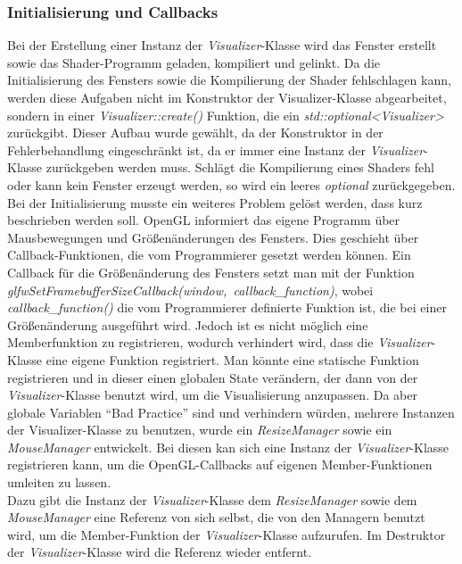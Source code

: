 \documentclass[11pt,a4paper]{article}
\begin{document}
\subsubsection{Initialisierung und Callbacks}
Bei der Erstellung einer Instanz der \mbox{\textit{Visualizer}}-Klasse wird das Fenster erstellt sowie das Shader-Programm geladen, kompiliert und gelinkt. Da die Initialisierung des Fensters sowie die Kompilierung der Shader fehlschlagen kann, werden diese Aufgaben nicht im Konstruktor der Visualizer-Klasse abgearbeitet, sondern in einer \mbox{\textit{Visualizer::create()}} Funktion, die ein \mbox{\textit{std::optional<Visualizer>}} zurückgibt. Dieser Aufbau wurde gewählt, da der Konstruktor in der Fehlerbehandlung eingeschränkt ist, da er immer eine Instanz der \mbox{\textit{Visualizer}}-Klasse zurückgeben werden muss. Schlägt die Kompilierung eines Shaders fehl oder kann kein Fenster erzeugt werden, so wird ein leeres \mbox{\textit{optional}} zurückgegeben.\\
Bei der Initialisierung musste ein weiteres Problem gelöst werden, dass kurz beschrieben werden soll. OpenGL informiert das eigene Programm über Mausbewegungen und Größenänderungen des Fensters. Dies geschieht über Callback-Funktionen, die vom Programmierer gesetzt werden können. Ein Callback für die Größenänderung des Fensters setzt man mit der Funktion \mbox{\textit{glfwSetFramebufferSizeCallback(window, callback\_function)}}, wobei \mbox{\textit{callback\_function()}} die vom Programmierer definierte Funktion ist, die bei einer Größenänderung ausgeführt wird. Jedoch ist es nicht möglich eine Memberfunktion zu registrieren, wodurch verhindert wird, dass die \mbox{\textit{Visualizer}}-Klasse eine eigene Funktion registriert. Man könnte eine statische Funktion registrieren und in dieser einen globalen State verändern, der dann von der \mbox{\textit{Visualizer}}-Klasse benutzt wird, um die Visualisierung anzupassen. Da aber globale Variablen ``Bad Practice'' sind und verhindern würden, mehrere Instanzen der Visualizer-Klasse zu benutzen, wurde ein \mbox{\textit{ResizeManager}} sowie ein \mbox{\textit{MouseManager}} entwickelt. Bei diesen kan sich eine Instanz der \mbox{\textit{Visualizer}}-Klasse registrieren kann, um die OpenGL-Callbacks auf eigenen Member-Funktionen umleiten zu lassen.\\
Dazu gibt die Instanz der \mbox{\textit{Visualizer}}-Klasse dem \mbox{\textit{ResizeManager}} sowie dem \mbox{\textit{MouseManager}} eine Referenz von sich selbst, die von den Managern benutzt wird, um die Member-Funktion der \mbox{\textit{Visualizer}}-Klasse aufzurufen. Im Destruktor der \mbox{\textit{Visualizer}}-Klasse wird die Referenz wieder entfernt.
\end{document}
